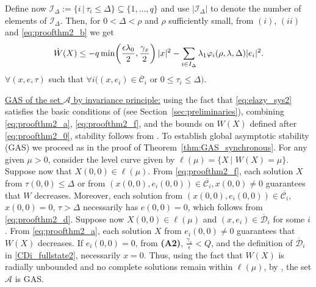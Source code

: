 \documentclass[twocolumn]{autart}
\begin{document}
Define now $\mathcal{I}_{\Delta}:=\{i\,|\, \tau_i \leq \Delta\}\subseteq \{1,\dots,q\}$
and use $|\mathcal{I}_{\Delta}|$ to denote the number of elements of 
$\mathcal{I}_{\Delta}$.
Then, for $0<\Delta<\rho$ and $\rho$ sufficiently small,  
from $(i)$, $(ii)$ and \eqref{eq:proofthm2_b} we get 
\begin{equation}
\label{eq:proofthm2_f}
 \dot{W}(X) 
\leq -q \min\!\left(\frac{\epsilon\lambda_0}{2},\frac{\gamma_x}{2} \right) |x|^2
- \sum\nolimits\limits_{i\in I_{\Delta}} \lambda_1\varphi_i(\rho,\lambda,\Delta) |e_i|^2. \\
\end{equation}
$\forall (x,e,\tau)$ such that 
$\forall i\big( (x,e_i)\!\in\! \overline{\mathcal{C}}_i 
	  \mbox{ or } 0 \!\leq\! \tau_i \!\leq\! \Delta \big)$.

{ \underline{GAS of the set $\mathcal{A}$ by invariance principle:}}
using the fact that \eqref{eq:elazy_sys2} 
satisfies the basic conditions of \cite{GoebelCSM09} (see Section~\ref{sec:preliminaries}), 
combining \eqref{eq:proofthm2_a}, \eqref{eq:proofthm2_f}, and 
the bounds on $W(X)$ defined after 
\eqref{eq:proofthm2_0}, stability follows from \cite[Theorem 23]{GoebelCSM09}.
To establish global asymptotic stability (GAS) we proceed as 
in the proof of Theorem~\ref{thm:GAS_synchronous}.
For any given $\mu>0$,
consider the level curve given by 
$\ell(\mu) = \{X\,|\,\,W(X)=\mu\}$.
Suppose now that $X(0,0)\in \ell(\mu)$. From
\eqref{eq:proofthm2_f}, 
each solution $X$ from $\tau(0,0) \leq \Delta$ or
from $(x(0,0),e_i(0,0))\in\overline{\mathcal{C}_i},x(0,0)\neq 0$
guarantees that $W$ decreases. Moreover, each solution from 
$(x(0,0),e_i(0,0))\in\overline{\mathcal{C}_i}$, $x(0,0)= 0$, 
$\tau> \Delta$ necessarily has $e(0,0)=0$, 
which follows from \eqref{eq:proofthm2_d}.
Suppose now $X(0,0)\in \ell(\mu)$ and 
$(x,e_i)\in \overline{\mathcal{D}}_i$
for some $i$.  
From \eqref{eq:proofthm2_a},
each solution $X$ from 
$e_i(0,0)\neq 0$ guarantees that $W(X)$ decreases. 
If $e_i(0,0) = 0$, from \textbf{(A2)}, $\frac{\gamma_x}{\epsilon} < Q$,
and the definition of $\overline{\mathcal{D}}_i$ in \eqref{CDi_fullstate2},
necessarily $x=0$.
Thus, using the fact that $W(X)$ is radially unbounded and
no complete solutions remain within $\ell(\mu)$, 
by \cite[Theorem 23]{GoebelCSM09}, 
the set $\mathcal{A}$ is GAS.
\end{document}

